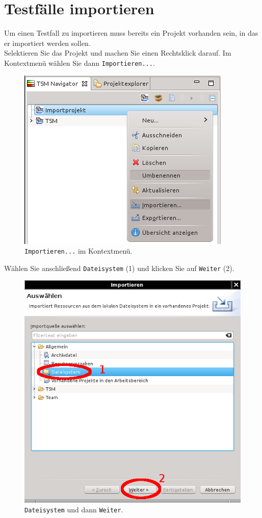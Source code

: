 \documentclass[11pt,a4paper,titlepage]{article}
\begin{document}
\section{Testfälle importieren}
Um einen Testfall zu importieren muss bereits ein Projekt vorhanden sein, in das er importiert werden sollen.\\
Selektieren Sie das Projekt und machen Sie einen Rechtsklick darauf. Im Kontextmenü wählen Sie dann \texttt{Importieren...}.
\begin{figure}[H]
 \centering
 \includegraphics{./kontextmenue-imp.png}
 \caption{\texttt{Importieren...} im Kontextmenü.}
 \label{abb:Kontextmenue-imp}
\end{figure}
\vspace{\baselineskip}
Wählen Sie anschließend \texttt{Dateisystem} (1) und klicken Sie auf \texttt{Weiter} (2).
\begin{figure}[H]
 \centering
 \includegraphics{./assistent-imp1.png}
 \caption{\texttt{Dateisystem} und dann \texttt{Weiter}.}
 \label{abb:Assistent-imp1}
\end{figure}
\end{document}
